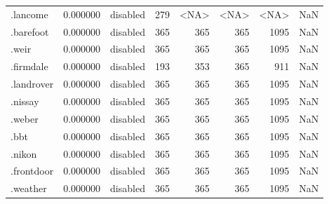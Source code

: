\begin{tabular}{lrlrrrrl}
.lancome                  &          0.000000 &        disabled &                         279 &                        <NA> &                        <NA> &                <NA> &                  NaN \\
.barefoot                 &          0.000000 &        disabled &                         365 &                         365 &                         365 &                1095 &                  NaN \\
.weir                     &          0.000000 &        disabled &                         365 &                         365 &                         365 &                1095 &                  NaN \\
.firmdale                 &          0.000000 &        disabled &                         193 &                         353 &                         365 &                 911 &                  NaN \\
.landrover                &          0.000000 &        disabled &                         365 &                         365 &                         365 &                1095 &                  NaN \\
.nissay                   &          0.000000 &        disabled &                         365 &                         365 &                         365 &                1095 &                  NaN \\
.weber                    &          0.000000 &        disabled &                         365 &                         365 &                         365 &                1095 &                  NaN \\
.bbt                      &          0.000000 &        disabled &                         365 &                         365 &                         365 &                1095 &                  NaN \\
.nikon                    &          0.000000 &        disabled &                         365 &                         365 &                         365 &                1095 &                  NaN \\
.frontdoor                &          0.000000 &        disabled &                         365 &                         365 &                         365 &                1095 &                  NaN \\
.weather                  &          0.000000 &        disabled &                         365 &                         365 &                         365 &                1095 &                  NaN \\

\end{tabular}
